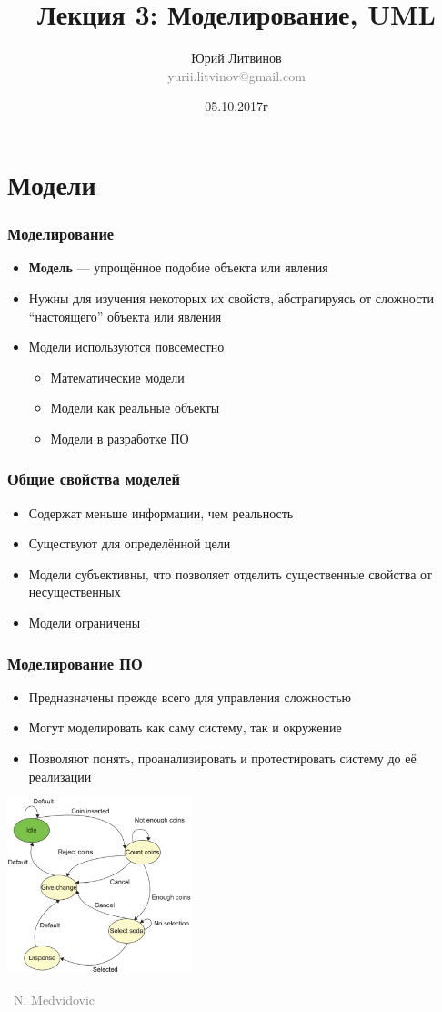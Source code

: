 \documentclass[xetex,mathserif,serif]{beamer}
\title[Моделирование]{Лекция 3: Моделирование, UML}
\author[Юрий Литвинов]{Юрий Литвинов\\\small{\textcolor{gray}{yurii.litvinov@gmail.com}}}
\date{05.10.2017г}
\newcommand{\attribution}[1] {
	\vspace{-5mm}\begin{flushright}\begin{scriptsize}\textcolor{gray}{\textcopyright\, #1}\end{scriptsize}\end{flushright}
}
\begin{document}
	\frame{\titlepage}

	\section{Модели}

	\begin{frame}
		\frametitle{Моделирование}
		\begin{itemize}
			\item \textbf{Модель} --- упрощённое подобие объекта или явления
			\item Нужны для изучения некоторых их свойств, абстрагируясь от сложности ``настоящего'' объекта или явления
			\item Модели используются повсеместно
			\begin{itemize}
				\item Математические модели
				\item Модели как реальные объекты
				\item Модели в разработке ПО
			\end{itemize}
		\end{itemize}
	\end{frame}

	\begin{frame}
		\frametitle{Общие свойства моделей}
		\begin{itemize}
			\item Содержат меньше информации, чем реальность
			\item Существуют для определённой цели
			\item Модели субъективны, что позволяет отделить существенные свойства от несущественных
			\item Модели ограничены
		\end{itemize}

	\end{frame}

	\begin{frame}
		\frametitle{Моделирование ПО}
		\begin{itemize}
			\item Предназначены прежде всего для управления сложностью
			\item Могут моделировать как саму систему, так и окружение
			\item Позволяют понять, проанализировать и протестировать систему до её реализации
		\end{itemize}
		\begin{center}
			\includegraphics[width=0.4\textwidth]{vendingMachine.png}
			\attribution{N. Medvidovic}
		\end{center}
	\end{frame}
\end{document}
